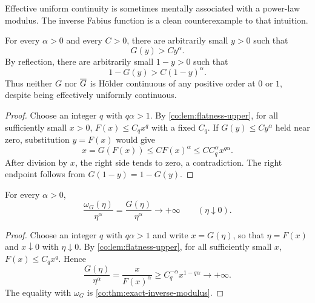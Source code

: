 Effective uniform continuity is sometimes mentally associated with a power-law
modulus.  The inverse Fabius function is a clean counterexample to that
intuition.

\begin{theorem}
\label{co:thm:no-holder}
For every $\alpha>0$ and every $C>0$, there are arbitrarily small $y>0$ such
that
\begin{equation}\label{co:eq:no-holder-zero}
 G(y)>Cy^\alpha.
\end{equation}
By reflection, there are arbitrarily small $1-y>0$ such that
\begin{equation}\label{co:eq:no-holder-one}
 1-G(y)>C(1-y)^\alpha.
\end{equation}
Thus neither $G$ nor $\overline G$ is H\"older continuous of any positive order at
$0$ or $1$, despite being effectively uniformly continuous.
\end{theorem}

\begin{proof}
Choose an integer $q$ with $q\alpha>1$.  By
\cref{co:lem:flatness-upper}, for all sufficiently small $x>0$,
$F(x)\le C_qx^q$ with a fixed $C_q$.  If $G(y)\le Cy^\alpha$ held near zero,
substitution $y=F(x)$ would give
\[
 x=G(F(x))\le C F(x)^\alpha
 \le C C_q^\alpha x^{q\alpha}.
\]
After division by $x$, the right side tends to zero, a contradiction.  The
right endpoint follows from $G(1-y)=1-G(y)$.
\end{proof}

\begin{corollary}\label{co:cor:sub-holder}
For every $\alpha>0$,
\begin{equation}\label{co:eq:sub-holder}
 \frac{\omega_G(\eta)}{\eta^\alpha}
 =\frac{G(\eta)}{\eta^\alpha}\longrightarrow+\infty
 \qquad(\eta\downarrow0).
\end{equation}
\end{corollary}

\begin{proof}
Choose an integer $q$ with $q\alpha>1$ and write $x=G(\eta)$, so that
$\eta=F(x)$ and $x\downarrow0$ with $\eta\downarrow0$.  By
\cref{co:lem:flatness-upper}, for all sufficiently small $x$,
$F(x)\le C_qx^q$.  Hence
\[
 \frac{G(\eta)}{\eta^\alpha}
 =\frac{x}{F(x)^\alpha}
 \ge C_q^{-\alpha}x^{1-q\alpha}\longrightarrow+\infty.
\]
The equality with $\omega_G$ is \cref{co:thm:exact-inverse-modulus}.
\end{proof}

